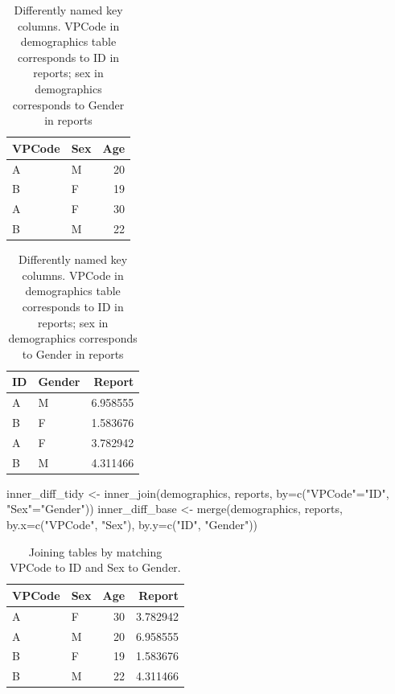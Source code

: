\documentclass[
]{book}
\newenvironment{Shaded}{\begin{snugshade}}{\end{snugshade}}
\newcommand{\AttributeTok}[1]{\textcolor[rgb]{0.77,0.63,0.00}{#1}}
\newcommand{\FunctionTok}[1]{\textcolor[rgb]{0.00,0.00,0.00}{#1}}
\newcommand{\NormalTok}[1]{#1}
\newcommand{\OtherTok}[1]{\textcolor[rgb]{0.56,0.35,0.01}{#1}}
\newcommand{\StringTok}[1]{\textcolor[rgb]{0.31,0.60,0.02}{#1}}
\begin{document}
\begin{table}
\caption{\label{tab:unnamed-chunk-194}Differently named key columns. VPCode in demographics table corresponds to ID in reports; sex in demographics corresponds to Gender in reports}

\centering
\begin{tabular}[t]{l|l|r}
\hline
VPCode & Sex & Age\\
\hline
A & M & 20\\
\hline
B & F & 19\\
\hline
A & F & 30\\
\hline
B & M & 22\\
\hline
\end{tabular}
\centering
\begin{tabular}[t]{l|l|r}
\hline
ID & Gender & Report\\
\hline
A & M & 6.958555\\
\hline
B & F & 1.583676\\
\hline
A & F & 3.782942\\
\hline
B & M & 4.311466\\
\hline
\end{tabular}
\end{table}

\begin{Shaded}
\begin{Highlighting}[]
\NormalTok{inner\_diff\_tidy }\OtherTok{\textless{}{-}} \FunctionTok{inner\_join}\NormalTok{(demographics, reports, }\AttributeTok{by=}\FunctionTok{c}\NormalTok{(}\StringTok{"VPCode"}\OtherTok{=}\StringTok{"ID"}\NormalTok{, }\StringTok{"Sex"}\OtherTok{=}\StringTok{"Gender"}\NormalTok{))}
\NormalTok{inner\_diff\_base }\OtherTok{\textless{}{-}} \FunctionTok{merge}\NormalTok{(demographics, reports, }\AttributeTok{by.x=}\FunctionTok{c}\NormalTok{(}\StringTok{"VPCode"}\NormalTok{, }\StringTok{"Sex"}\NormalTok{), }\AttributeTok{by.y=}\FunctionTok{c}\NormalTok{(}\StringTok{"ID"}\NormalTok{, }\StringTok{"Gender"}\NormalTok{))}
\end{Highlighting}
\end{Shaded}

\begin{table}

\caption{\label{tab:unnamed-chunk-196}Joining tables by matching VPCode to ID and Sex to Gender.}
\centering
\begin{tabular}[t]{l|l|r|r}
\hline
VPCode & Sex & Age & Report\\
\hline
A & F & 30 & 3.782942\\
\hline
A & M & 20 & 6.958555\\
\hline
B & F & 19 & 1.583676\\
\hline
B & M & 22 & 4.311466\\
\hline
\end{tabular}
\end{table}
\end{document}
